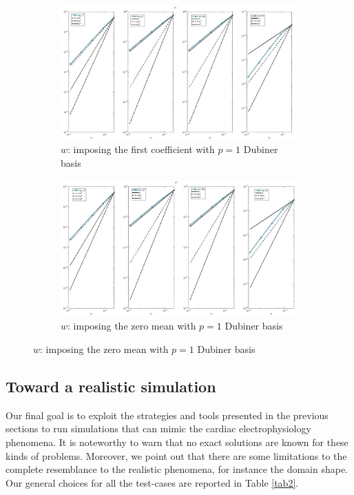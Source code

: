 \documentclass[a4paper,11pt]{article}
\begin{document}
\begin{figure}[H]
\caption{Comparison of the gating variable ($w$)}
\label{w-unique}
\begin{subfigure}{\textwidth}
\begin{center}
\includegraphics[width = \textwidth]{./D1_w_1.jpg}
\caption{$w$: imposing the first coefficient with $p=1$ Dubiner basis}
\end{center}
\end{subfigure}
\begin{subfigure}{\textwidth}
\begin{center}
\includegraphics[width =\textwidth]{./D1_w_2.jpg}
\caption{$w$: imposing the zero mean with $p=1$ Dubiner basis}
\end{center}
\end{subfigure}
\end{figure}
\restoregeometry
\newpage

\subsection{Toward a realistic simulation} \label{real_sim}
Our final goal is to exploit the strategies and tools presented in the previous sections to run simulations that can mimic the cardiac electrophysiology phenomena. It is noteworthy to warn that no exact solutions are known for these kinds of problems. Moreover, we point out that there are some limitations to the complete resemblance to the realistic phenomena, for instance the domain shape. Our general choices for all the test-cases are reported in Table \ref{tab2}.
\end{document}
